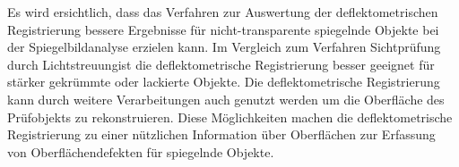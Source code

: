 \p
Es wird ersichtlich, dass das Verfahren zur Auswertung der deflektometrischen Registrierung bessere Ergebnisse für nicht-transparente spiegelnde Objekte bei der Spiegelbildanalyse erzielen kann.
Im Vergleich zum Verfahren \glqq Sichtprüfung durch Lichtstreuung\grqq ist die deflektometrische Registrierung besser geeignet für stärker gekrümmte oder lackierte Objekte.
Die deflektometrische Registrierung kann durch weitere Verarbeitungen auch genutzt werden um die Oberfläche des Prüfobjekts zu rekonstruieren.
Diese Möglichkeiten machen die deflektometrische Registrierung zu einer nützlichen Information über Oberflächen zur Erfassung von Oberflächendefekten für spiegelnde Objekte.